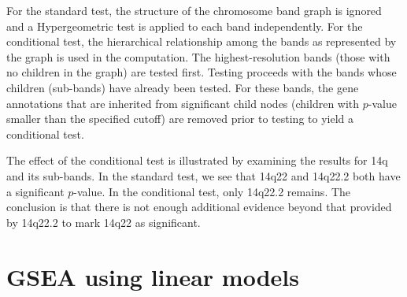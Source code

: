 \documentclass[11pt]{article}
\begin{document}
%


For the standard test, the structure of the chromosome band graph is
ignored and a Hypergeometric test is applied to each band
independently.  For the conditional test, the hierarchical
relationship among the bands as represented by the graph is used in
the computation.  The highest-resolution bands (those with no children
in the graph) are tested first.  Testing proceeds with the bands whose
children (sub-bands) have already been tested.  For these bands, the
gene annotations that are inherited from significant child nodes
(children with $p$-value smaller than the specified cutoff) are
removed prior to testing to yield a conditional test.

The effect of the conditional test is illustrated by examining the
results for 14q and its sub-bands.  In the standard test, we see that
14q22 and 14q22.2 both have a significant $p$-value.  In the
conditional test, only 14q22.2 remains.  The conclusion is that there
is not enough additional evidence beyond that provided by 14q22.2 to
mark 14q22 as significant.







\section{GSEA using linear models}
\end{document}
